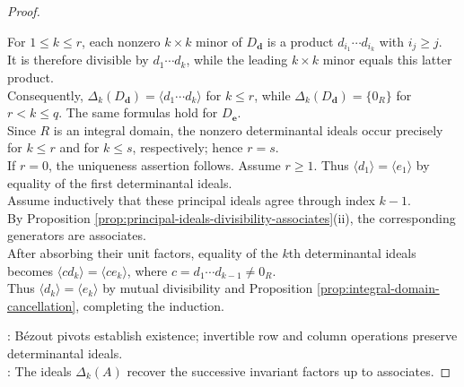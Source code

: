 \begin{theorem}
\begin{proof}
\begin{enumerate}[label=(\roman*)]
For $1\leq k\leq r$, each nonzero $k\times k$ minor of $D_{\mathbf{d}}$ is a product $d_{i_1}\cdots d_{i_k}$ with $i_j\geq j$.\\
It is therefore divisible by $d_1\cdots d_k$, while the leading $k\times k$ minor equals this latter product.\\
Consequently, $\Delta_k(D_{\mathbf{d}})=\langle d_1\cdots d_k\rangle$ for $k\leq r$, while $\Delta_k(D_{\mathbf{d}})=\{0_R\}$ for $r<k\leq q$. The same formulas hold for $D_{\mathbf{e}}$.\\
Since $R$ is an integral domain, the nonzero determinantal ideals occur precisely for $k\leq r$ and for $k\leq s$, respectively; hence $r=s$.\\
If $r=0$, the uniqueness assertion follows. Assume $r\geq1$. Thus $\langle d_1\rangle=\langle e_1\rangle$ by equality of the first determinantal ideals.\\
Assume inductively that these principal ideals agree through index $k-1$.\\
By Proposition \ref{prop:principal-ideals-divisibility-associates}(ii), the corresponding generators are associates.\\
After absorbing their unit factors, equality of the $k$th determinantal ideals becomes $\langle cd_k\rangle=\langle ce_k\rangle$, where $c=d_1\cdots d_{k-1}\neq0_R$.\\
Thus $\langle d_k\rangle=\langle e_k\rangle$ by mutual divisibility and Proposition \ref{prop:integral-domain-cancellation}, completing the induction.
\end{enumerate}
\noindent
{}: Bézout pivots establish existence; invertible row and column operations preserve determinantal ideals.\\
: The ideals $\Delta_k(A)$ recover the successive invariant factors up to associates.
\end{proof}
\end{theorem}

